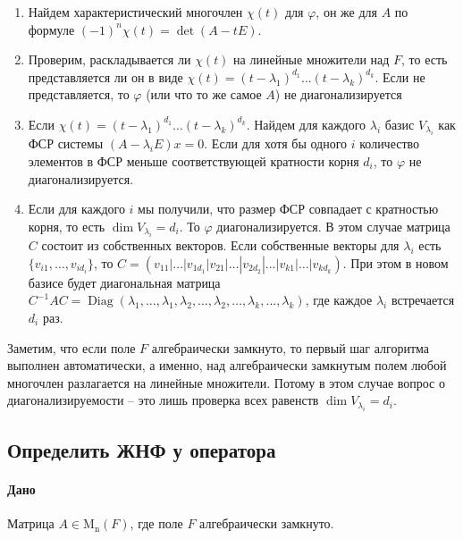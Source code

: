 \documentclass{article}
\newcommand{\Matrix}[2]{\operatorname{\mathrm{M}_{#2}}(#1)}
\begin{document}
\begin{enumerate}
\item Найдем характеристический многочлен $\chi(t)$ для $\varphi$, он же для $A$ по формуле $(-1)^n\chi(t) = \det(A-t E)$.

\item Проверим, раскладывается ли $\chi(t)$ на линейные множители над $F$, то есть представляется ли он в виде $\chi(t) = (t-\lambda_1)^{d_1} \ldots (t-\lambda_k)^{d_k}$.
Если не представляется, то $\varphi$ (или что то же самое $A$) не диагонализируется

\item Если $\chi(t) = (t-\lambda_1)^{d_1} \ldots (t-\lambda_k)^{d_k}$.
Найдем для каждого $\lambda_i$ базис $V_{\lambda_i}$ как ФСР системы $(A-\lambda_i E)x = 0$.
Если для хотя бы одного $i$ количество элементов в ФСР меньше соответствующей кратности корня $d_i$, то $\varphi$ не диагонализируется.

\item Если для каждого $i$ мы получили, что размер ФСР совпадает с кратностью корня, то есть $\dim V_{\lambda_i} = d_i$.
То $\varphi$ диагонализируется.
В этом случае матрица $C$ состоит из собственных векторов.
Если собственные векторы для $\lambda_i$ есть $\{v_{i1},\ldots,v_{id_i}\}$, то $C = (v_{11}|\ldots|v_{1d_1}|v_{21}|\ldots|v_{2d_2}|\ldots |v_{k1}|\ldots|v_{kd_k})$.
При этом в новом базисе будет диагональная матрица $C^{-1}AC =\operatorname{Diag}(\lambda_1,\ldots,\lambda_1,\lambda_2,\ldots,\lambda_2,\ldots,\lambda_k,\ldots,\lambda_k)$, где каждое $\lambda_i$ встречается $d_i$ раз.
\end{enumerate}

Заметим, что если поле $F$ алгебраически замкнуто, то первый шаг алгоритма выполнен автоматически, а именно, над алгебраически замкнутым полем любой многочлен разлагается на линейные множители.
Потому в этом случае вопрос о диагонализируемости -- это лишь проверка всех равенств $\dim V_{\lambda_i} = d_i$.

\subsection{Определить ЖНФ у оператора}

\paragraph{Дано}

Матрица $A\in \Matrix{F}{n}$, где поле $F$ алгебраически замкнуто.
\end{document}
